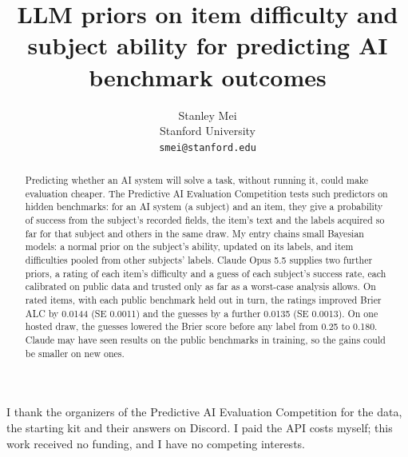 \documentclass{article}
\title{LLM priors on item difficulty and subject ability for predicting AI benchmark outcomes}
\author{
  Stanley Mei \\
  Stanford University \\
  \texttt{smei@stanford.edu}
}
\begin{document}
\maketitle

\begin{abstract}
  Predicting whether an AI system will solve a task, without running it, could make evaluation cheaper. The Predictive AI Evaluation Competition tests such predictors on hidden benchmarks: for an AI system (a subject) and an item, they give a probability of success from the subject's recorded fields, the item's text and the labels acquired so far for that subject and others in the same draw. My entry chains small Bayesian models: a normal prior on the subject's ability, updated on its labels, and item difficulties pooled from other subjects' labels. Claude Opus 5.5 supplies two further priors, a rating of each item's difficulty and a guess of each subject's success rate, each calibrated on public data and trusted only as far as a worst-case analysis allows. On rated items, with each public benchmark held out in turn, the ratings improved Brier ALC by 0.0144 (SE 0.0011) and the guesses by a further 0.0135 (SE 0.0013). On one hosted draw, the guesses lowered the Brier score before any label from 0.25 to 0.180. Claude may have seen results on the public benchmarks in training, so the gains could be smaller on new ones.
\end{abstract}











\begin{ack}
I thank the organizers of the Predictive AI Evaluation Competition for the data, the starting kit and their answers on Discord. I paid the API costs myself; this work received no funding, and I have no competing interests.
\end{ack}

{\small


}

\appendix









\newpage

\end{document}
